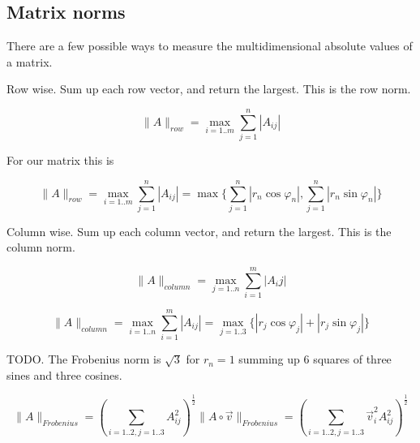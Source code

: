\documentclass[a4paper]{article}
\begin{document}
\subsection{Matrix norms}

There are a few possible ways to measure the multidimensional absolute values of a matrix.

Row wise. Sum up each row vector, and return the largest. This is the row norm.

\begin{displaymath}
\|A\|_{row} = \max_{i=1..m} { \sum_{j=1}^{n} |A_{ij}| }
\end{displaymath}

For our matrix this is

\begin{displaymath}
\|A\|_{row} = \max_{i=1..m} { \sum_{j=1}^{n} |A_{ij}| } = \max\{ \sum_{j=1}^{n} |r_n\cos\varphi_n|, \sum_{j=1}^{n} |r_n\sin\varphi_n| \}
\end{displaymath}


Column wise. Sum up each column vector, and return the largest. This is the column norm.

\begin{displaymath}
\|A\|_{column} = \max_{j=1..n} { \sum_{i=1}^{m} |A_{i}j| }
\end{displaymath}

\begin{displaymath}
\|A\|_{column} = \max_{i=1..n} { \sum_{i=1}^{m} |A_{ij}| } = \max_{j=1..3}\{ |r_j\cos\varphi_j| + |r_j\sin\varphi_j| \}
\end{displaymath}

TODO. The Frobenius norm is $\sqrt{3}$ for $r_n = 1$ summing up 6 squares of three sines and three cosines.

\begin{displaymath}
\|A\|_{Frobenius} = (\sum_{i=1..2,j=1..3}A_{ij}^{2})^{\frac12}
\|A\circ\vec{v}\|_{Frobenius} = (\sum_{i=1..2,j=1..3}\vec{v}_{i}^{2}A_{ij}^{2})^{\frac12}
\end{displaymath}
\end{document}
